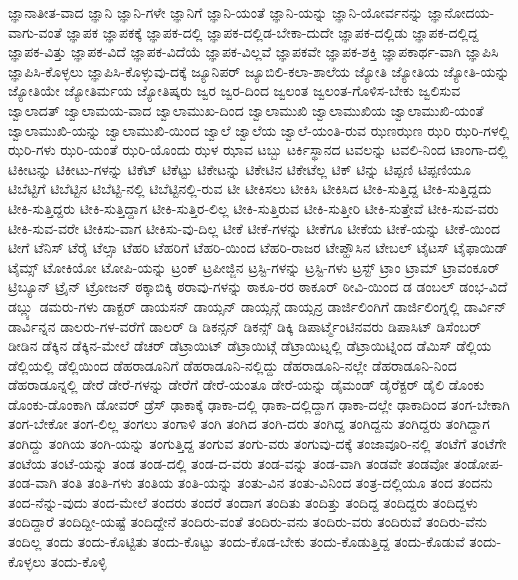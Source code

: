 {ಜ್ಞಾನಾತೀತ-ವಾದ
ಜ್ಞಾನಿ
ಜ್ಞಾನಿ-ಗಳೇ
ಜ್ಞಾನಿಗೆ
ಜ್ಞಾನಿ-ಯಂತೆ
ಜ್ಞಾನಿ-ಯನ್ನು
ಜ್ಞಾನಿ-ಯೋರ್ವನನ್ನು
ಜ್ಞಾನೋದಯ-ವಾಗು-ವಂತೆ
ಜ್ಞಾಪಕ
ಜ್ಞಾಪಕಕ್ಕೆ
ಜ್ಞಾಪಕ-ದಲ್ಲಿ
ಜ್ಞಾಪಕ-ದಲ್ಲಿಡ-ಬೇಕಾ-ದುದೇ
ಜ್ಞಾಪಕ-ದಲ್ಲಿಡು
ಜ್ಞಾಪಕ-ದಲ್ಲಿದ್ದ
ಜ್ಞಾಪಕ-ವಿತ್ತು
ಜ್ಞಾಪಕ-ವಿದೆ
ಜ್ಞಾಪಕ-ವಿದೆಯೆ
ಜ್ಞಾಪಕ-ವಿಲ್ಲವೆ
ಜ್ಞಾಪಕವೇ
ಜ್ಞಾಪಕ-ಶಕ್ತಿ
ಜ್ಞಾಪಕಾರ್ಥ-ವಾಗಿ
ಜ್ಞಾಪಿಸಿ
ಜ್ಞಾಪಿಸಿ-ಕೊಳ್ಳಲು
ಜ್ಞಾಪಿಸಿ-ಕೊಳ್ಳುವು-ದಕ್ಕೆ
ಜ್ಯೂನಿಪರ್
ಜ್ಯೂಬಿಲಿ-ಕಲಾ-ಶಾಲೆಯ
ಜ್ಯೋತಿ
ಜ್ಯೋತಿಯ
ಜ್ಯೋತಿ-ಯನ್ನು
ಜ್ಯೋತಿಯೇ
ಜ್ಯೋತಿರ್ಮಯ
ಜ್ಯೋತಿಷ್ಕರು
ಜ್ವರ
ಜ್ವರ-ದಿಂದ
ಜ್ವಲಂತ
ಜ್ವಲಂತ-ಗೊಳಿಸ-ಬೇಕು
ಜ್ವಲಿಸುವ
ಜ್ವಾಲಾದತ್
ಜ್ವಾಲಾಮಯ-ವಾದ
ಜ್ವಾಲಾಮುಖ-ದಿಂದ
ಜ್ವಾಲಾಮುಖಿ
ಜ್ವಾಲಾಮುಖಿಯ
ಜ್ವಾಲಾಮುಖಿ-ಯಂತೆ
ಜ್ವಾಲಾಮುಖಿ-ಯನ್ನು
ಜ್ವಾಲಾಮುಖಿ-ಯಿಂದ
ಜ್ವಾಲೆ
ಜ್ವಾಲೆಯ
ಜ್ವಾಲೆ-ಯಂತಿ-ರುವ
ಝಣಝಣ
ಝರಿ
ಝರಿ-ಗಳಲ್ಲಿ
ಝರಿ-ಗಳು
ಝರಿ-ಯಂತೆ
ಝರಿ-ಯೊಂದು
ಝಳ
ಝಾವ
ಟಬ್ಬು
ಟರ್ಕಿಸ್ಥಾನದ
ಟವಲನ್ನು
ಟವಲಿ-ನಿಂದ
ಟಾಂಗಾ-ದಲ್ಲಿ
ಟಿಕೀಟನ್ನು
ಟಿಕೀಟು-ಗಳನ್ನು
ಟಿಕೆಟ್
ಟಿಕೆಟ್ಟು
ಟಿಕೇಟನ್ನು
ಟಿಕೇಟಿನ
ಟಿಕೇಟೆಲ್ಲ
ಟಿಕ್
ಟಿನ್ನು
ಟಿಪ್ಪಣಿ
ಟಿಪ್ಪಣಿಯೂ
ಟಿಬೆಟ್ಟಿಗೆ
ಟಿಬೆಟ್ಟಿನ
ಟಿಬೆಟ್ಟಿ-ನಲ್ಲಿ
ಟಿಬೆಟ್ಟಿನಲ್ಲಿ-ರುವ
ಟೀ
ಟೀಕಿಸಲು
ಟೀಕಿಸಿ
ಟೀಕಿಸಿದ
ಟೀಕಿ-ಸುತ್ತಿದ್ದ
ಟೀಕಿ-ಸುತ್ತಿದ್ದದು
ಟೀಕಿ-ಸುತ್ತಿದ್ದರು
ಟೀಕಿ-ಸುತ್ತಿದ್ದಾಗ
ಟೀಕಿ-ಸುತ್ತಿರ-ಲಿಲ್ಲ
ಟೀಕಿ-ಸುತ್ತಿರುವ
ಟೀಕಿ-ಸುತ್ತೀರಿ
ಟೀಕಿ-ಸುತ್ತೇವೆ
ಟೀಕಿ-ಸುವ-ವರು
ಟೀಕಿ-ಸುವ-ವರೇ
ಟೀಕಿಸು-ವಾಗ
ಟೀಕಿಸು-ವು-ದಿಲ್ಲ
ಟೀಕೆ
ಟೀಕೆ-ಗಳನ್ನು
ಟೀಕೆಗೂ
ಟೀಕೆಯ
ಟೀಕೆ-ಯನ್ನು
ಟೀಕೆ-ಯಿಂದ
ಟೀಗೆ
ಟೆನಿಸ್
ಟೆರೈ
ಟೆಲ್ಸಾ
ಟೆಹರಿ
ಟೆಹರಿಗೆ
ಟೆಹರಿ-ಯಿಂದ
ಟೆಹರಿ-ರಾಜರ
ಟೇಪ್ಹೌಸಿನ
ಟೇಬಲ್
ಟೈಟಸ್
ಟೈಫಾಯಿಡ್
ಟೈಮ್ಸ್
ಟೋಕಿಯೋ
ಟೋಪಿ-ಯನ್ನು
ಟ್ರಂಕ್
ಟ್ರಪೀಜ್ಜಿನ
ಟ್ರಸ್ಟಿ-ಗಳನ್ನು
ಟ್ರಸ್ಟಿ-ಗಳು
ಟ್ರಸ್ಟ್
ಟ್ರಾಂ
ಟ್ರಾಮ್
ಟ್ರಾವಂಕೂರ್
ಟ್ರಿಬ್ಯೂನ್
ಟ್ರೈನ್
ಟ್ರೋಜನ್
ಠಕ್ಕಾಬಿಕ್ಕಿ
ಠರಾವು-ಗಳನ್ನು
ಠಾಕೂ-ರರ
ಠಾಕೂರ್
ಠೀವಿ-ಯಿಂದ
ಡ
ಡಂಬಲ್
ಡಂಭ-ವಿದೆ
ಡಬ್ಲ್ಯು
ಡಮರು-ಗಳು
ಡಾಕ್ಟರ್
ಡಾಯಸನ್
ಡಾಯ್ಸನ್
ಡಾಯ್ಸನ್ಗೆ
ಡಾಯ್ಸನ್ರ
ಡಾರ್ಜಿಲಿಂಗಿಗೆ
ಡಾರ್ಜಿಲಿಂಗ್ನಲ್ಲಿ
ಡಾರ್ವಿನ್
ಡಾರ್ವಿನ್ನನ
ಡಾಲರು-ಗಳ-ವರೆಗೆ
ಡಾಲರ್
ಡಿ
ಡಿಕನ್ಸನ್
ಡಿಕನ್ಸ್
ಡಿಕ್ಕಿ
ಡಿಪಾರ್ಟ್ಮೆಂಟಿನವರು
ಡಿಪಾಸಿಟ್
ಡಿಸೆಂಬರ್
ಡೀಡಿನ
ಡೆಕ್ಕಿನ
ಡೆಕ್ಕಿನ-ಮೇಲೆ
ಡೆಚರ್
ಡೆಟ್ರಾಯಿಟ್
ಡೆಟ್ರಾಯಿಟ್ಗೆ
ಡೆಟ್ರಾಯಿಟ್ನಲ್ಲಿ
ಡೆಟ್ರಾಯಿಟ್ನಿಂದ
ಡೆಮಿಸ್
ಡೆಲ್ಲಿಯ
ಡೆಲ್ಲಿಯಲ್ಲಿ
ಡೆಲ್ಲಿಯಿಂದ
ಡೆಹರಾಡೂನಿಗೆ
ಡೆಹರಾಡೂನಿ-ನಲ್ಲಿದ್ದು
ಡೆಹರಾಡೂನಿ-ನಲ್ಲೇ
ಡೆಹರಾಡೂನಿ-ನಿಂದ
ಡೆಹರಾಡೂನ್ನಲ್ಲಿ
ಡೇರೆ
ಡೇರೆ-ಗಳನ್ನು
ಡೇರೆಗೆ
ಡೇರೆ-ಯಂತೂ
ಡೇರೆ-ಯನ್ನು
ಡೈಮಂಡ್
ಡೈರೆಕ್ಟರ್
ಡೈಲಿ
ಡೊಂಕು
ಡೊಂಕು-ಡೊಂಕಾಗಿ
ಡೋವರ್
ಡ್ರೆಸ್
ಢಾಕಾಕ್ಕೆ
ಢಾಕಾ-ದಲ್ಲಿ
ಢಾಕಾ-ದಲ್ಲಿದ್ದಾಗ
ಢಾಕಾ-ದಲ್ಲೇ
ಢಾಕಾದಿಂದ
ತಂಗ-ಬೇಕಾಗಿ
ತಂಗ-ಬೇಕೋ
ತಂಗ-ಲಿಲ್ಲ
ತಂಗಲು
ತಂಗಾಳಿ
ತಂಗಿ
ತಂಗಿದ
ತಂಗಿ-ದರು
ತಂಗಿದ್ದ
ತಂಗಿದ್ದನು
ತಂಗಿದ್ದರು
ತಂಗಿದ್ದಾಗ
ತಂಗಿದ್ದು
ತಂಗಿಯ
ತಂಗಿ-ಯನ್ನು
ತಂಗುತ್ತಿದ್ದ
ತಂಗುವ
ತಂಗು-ವರು
ತಂಗುವು-ದಕ್ಕೆ
ತಂಜಾವೂರಿ-ನಲ್ಲಿ
ತಂಟೆಗೆ
ತಂಟೆಗೇ
ತಂಟೆಯ
ತಂಟೆ-ಯನ್ನು
ತಂಡ
ತಂಡ-ದಲ್ಲಿ
ತಂಡ-ದ-ವರು
ತಂಡ-ವನ್ನು
ತಂಡ-ವಾಗಿ
ತಂಡವೇ
ತಂಡವೋ
ತಂಡೋಪ-ತಂಡ-ವಾಗಿ
ತಂತಿ
ತಂತಿ-ಗಳು
ತಂತಿಯ
ತಂತಿ-ಯನ್ನು
ತಂತು-ವಿನ
ತಂತು-ವಿನಿಂದ
ತಂತ್ರ-ದಲ್ಲಿಯೂ
ತಂದ
ತಂದನು
ತಂದ-ನೆನ್ನು-ವುದು
ತಂದ-ಮೇಲೆ
ತಂದರು
ತಂದರೆ
ತಂದಾಗ
ತಂದಿತು
ತಂದಿತ್ತು
ತಂದಿದ್ದ
ತಂದಿದ್ದರು
ತಂದಿದ್ದಳು
ತಂದಿದ್ದಾರೆ
ತಂದಿದ್ದೀ-ಯಷ್ಟೆ
ತಂದಿದ್ದೇನೆ
ತಂದಿರು-ವಂತೆ
ತಂದಿರು-ವನು
ತಂದಿರು-ವರು
ತಂದಿರುವೆ
ತಂದಿರು-ವೆನು
ತಂದಿಲ್ಲ
ತಂದು
ತಂದು-ಕೊಟ್ಟಿತು
ತಂದು-ಕೊಟ್ಟು
ತಂದು-ಕೊಡ-ಬೇಕು
ತಂದು-ಕೊಡುತ್ತಿದ್ದ
ತಂದು-ಕೊಡುವೆ
ತಂದು-ಕೊಳ್ಳಲು
ತಂದು-ಕೊಳ್ಳಿ
}
